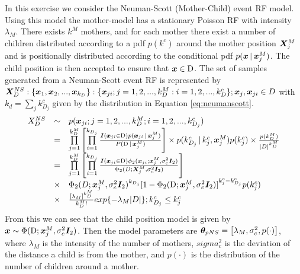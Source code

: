 \section{}
\label{sec:problem3}
In this exercise we consider the Neuman-Scott (Mother-Child) event RF model. Using this model the mother-model has a stationary Poisson RF with intensity $\lambda_M$. There exists $k^M$ mothers, and for each mother there exist a number of children distributed according to a pdf $p(k^c)$ around the mother position $\bm{X}_j^M$ and is positionally distributed according to the conditional pdf $p(\bm{x} \, | \, \bm{x}_j^M)$. The child position is then accepted to ensure that $\bm{x} \in \mathrm{D}$. The set of samples generated from a Neuman-Scott event RF is represented by $\bm{X}_D^{NS}:\{\bm{x}_1,\bm{x}_2,...,\bm{x}_{k_D}\}:\{\bm{x}_{ji};j=1,2,...,k_D^M:i = 1,2,...,k_D^c\};\bm{x}_j,\bm{x}_{ji}\in D$ with $k_d = \sum_j k_{D_j}^c$ given by the distribution in Equation \ref{eq:neumanscott}.
\begin{equation}
    \begin{array}{rcl}
        X_D^{NS} & \sim & p(\bm{x}_{ji}; j = 1,2,...,k_D^M; i =1,2,...,k_{D_j}^c) \\
         & = & \prod\limits_{j=1}^{k_D^M}\left[\prod\limits_{i=1}^{k_{D_j}}\frac{ \bm{I}(\bm{x}_{ji}\in \mathrm{D})p(\bm{x}_{ji}\, | \, \bm{x}_j^M)}{ P(\mathrm{D}\, | \, \bm{x}_j^M)}\right]\times p(k_{D_j}^c\, | \, k_j^c,\bm{x}_j^M)p(k_j^c)\times \frac{p(k_D^M)}{|D|^{k_D^M}} \\
         & = & \prod\limits_{j=1}^{k_D^M}\left[\prod\limits_{i=1}^{k_{D_j}}\frac{ \bm{I}(\bm{x}_{ji}\in \mathrm{D}) \phi_2(\bm{x}_{ji};\bm{x}_j^M,\sigma_c^2\bm{I}_2)}{ \Phi_2(D;\bm{X}_j^M,\sigma_c^2\bm{I}_2 )}\right] \\
         & \times & \Phi_2(D;\bm{x}_j^M,\sigma_c^2\bm{I}_2)^{k_{D_j}}[1-\Phi_2(\mathrm{D};\bm{x}_j^M,\sigma_c^2\bm{I}_2)]^{k_j^c-k_{D_j}^c}p(k_j^c)\\
          & \times & \frac{[\lambda_M]^{k_D^M}}{k_D^M!}exp\{-\lambda_M|D|\};k_{D_j}^c\leq k_j^c
         \end{array}
    \label{eq:neumanscott}
\end{equation}
From this we can see that the child position model is given by $\bm{x} \sim \Phi(\mathrm{D};\bm{x}_j^M, \sigma_c^2\bm{I}_2)$. Then the model parameters are $\bm{\theta}_{pNS} = \left[\lambda_M,\sigma_c^2,p(\cdot)\right]$, where $\lambda_M$ is the intensity of the number of mothers, $sigma_c^2$ is the deviation of the distance a child is from the mother, and $p(\cdot)$ is the distribution of the number of children around a mother. 

